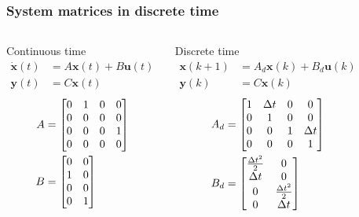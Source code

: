 \begin{frame} 
	\frametitle{System matrices in discrete time}
	\begin{columns}[onlytextwidth]
		\begin{block}{Continuous time}
			\vspace*{-1em}
			\begin{align*}
			\dot{\bm{x}}(t) &= A \bm{x}(t) + B \bm{u}(t)\\
			\bm{y}(t) &= C \bm{x}(t) 
			\end{align*}
			\vspace*{-2em}
			\begin{align*}
			A&=
			\begin{bmatrix}0&1&0&0\\0&0&0&0\\0&0&0&1\\0&0&0&0\end{bmatrix}
			\\
			B&=\begin{bmatrix}0&0\\ 1 &0\\0&0 \\0&1\end{bmatrix}
			\end{align*}
		\end{block}
		\centering
		\begin{block}{Discrete time \footnotemark}
			\vspace*{-1em}
			\begin{align*}
			\bm{x}(k+1) &= A_d \bm{x}(k) + B_d \bm{u}(k)\\
			\bm{y}(k) &= C \bm{x}(k) 
			\end{align*}
			\vspace*{-2em}
			\begin{align*}
			A_d&=\begin{bmatrix}1&\Delta t&0&0\\0&1&0&0\\0&0&1&\Delta t\\0&0&0&1\end{bmatrix}
			\\
			B_d&=\begin{bmatrix}\frac{\Delta t^2}{2}&0\\ \Delta t &0\\0&\frac{\Delta t^2}{2} \\0&\Delta t\end{bmatrix}
			\end{align*}
		\end{block}
	\end{columns}
\end{frame}

